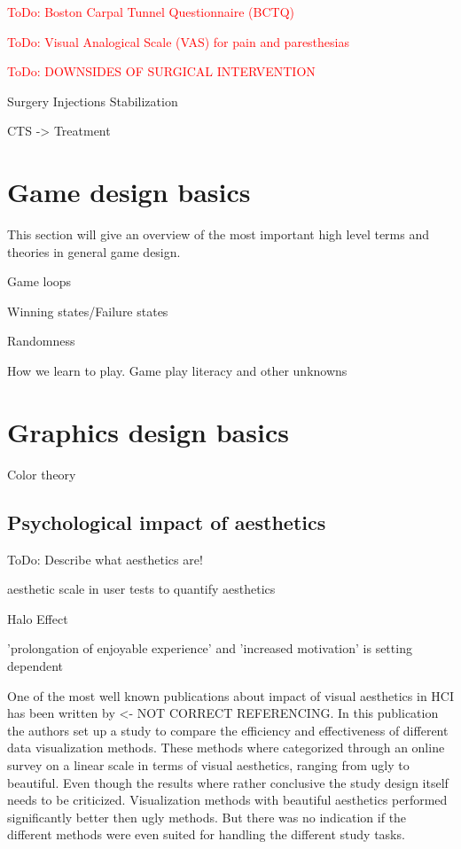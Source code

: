 \textcolor{red}{ToDo: Boston Carpal Tunnel Questionnaire (BCTQ)}

\textcolor{red}{ToDo: Visual Analogical Scale (VAS) for pain and paresthesias}

\textcolor{red}{ToDo: DOWNSIDES OF SURGICAL INTERVENTION}

Surgery
Injections
Stabilization

\gls{CTS} -> Treatment \cite{van2007repetitive}


\section{Game design basics}

This section will give an overview of the most important high level terms and theories in general game design.

Game loops

Winning states/Failure states

Randomness

How we learn to play. Game play literacy and other unknowns


\section{Graphics design basics}

Color theory

\subsection{Psychological impact of aesthetics}

ToDo: Describe what aesthetics are!

aesthetic scale in user tests to quantify aesthetics

Halo Effect

'prolongation of enjoyable experience' and 'increased motivation' is setting dependent \cite{sonderegger2010influence}

One of the most well known publications about impact of visual aesthetics in \gls{HCI} has been written by  <- NOT CORRECT REFERENCING.
In this publication the authors set up a study to compare the efficiency and effectiveness of different data visualization methods.
These methods where categorized through an online survey on a linear scale in terms of visual aesthetics, ranging from ugly to beautiful.
Even though the results where rather conclusive the study design itself needs to be criticized.
Visualization methods with beautiful aesthetics performed significantly better then ugly methods.
But there was no indication if the different methods were even suited for handling the different study tasks.

